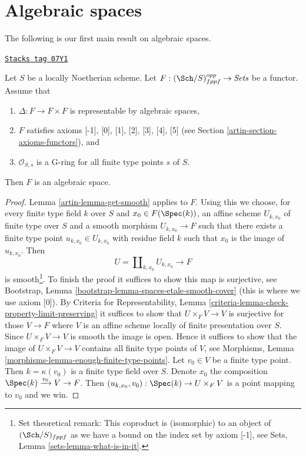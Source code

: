 \section{Algebraic spaces}
\label{artin-section-algebraic-spaces}
The following is our first main result on algebraic spaces.

\begin{proposition}
\label{artin-proposition-spaces-diagonal-representable}
\href{https://stacks.math.columbia.edu/tag/07Y1}{\texttt{Stacks tag 07Y1}}

Let $S$ be a locally Noetherian scheme. Let
$F : (\Sch/S)_{fppf}^{opp} \to \textit{Sets}$ be a functor. Assume that
\begin{enumerate}
\item $\Delta : F \to F \times F$ is representable by algebraic spaces,
\item $F$ satisfies axioms [-1], [0], [1], [2], [3], [4], [5]
(see Section \ref{artin-section-axioms-functors}), and
\item $\mathcal{O}_{S, s}$ is a G-ring for all finite type points $s$ of $S$.
\end{enumerate}
Then $F$ is an algebraic space.
\end{proposition}

\begin{proof}

Lemma \ref{artin-lemma-get-smooth} applies to $F$. Using this we
choose, for every finite type field $k$ over $S$ and $x_0 \in F(\Spec(k))$,
an affine scheme $U_{k, x_0}$ of finite type over $S$ and a smooth morphism
$U_{k, x_0} \to F$ such that there exists a finite type point
$u_{k, x_0} \in U_{k, x_0}$ with residue field $k$ such that $x_0$
is the image of $u_{k, x_0}$. Then
$$
U = \coprod\nolimits_{k, x_0} U_{k, x_0} \longrightarrow F
$$
is smooth\footnote{Set theoretical remark: This coproduct is (isomorphic)
to an object of $(\Sch/S)_{fppf}$ as we have a bound on the index set
by axiom [-1], see Sets, Lemma \ref{sets-lemma-what-is-in-it}.}.
To finish the proof it suffices to show this map is surjective,
see Bootstrap, Lemma \ref{bootstrap-lemma-spaces-etale-smooth-cover}
(this is where we use axiom [0]). By Criteria for Representability, Lemma
\ref{criteria-lemma-check-property-limit-preserving}
it suffices to show that $U \times_F V \to V$ is surjective for those
$V \to F$ where $V$ is an affine scheme locally of finite presentation
over $S$. Since $U \times_F V \to V$ is smooth the image is open. Hence
it suffices to show that the image of $U \times_F V \to V$ contains all
finite type points of $V$, see
Morphisms, Lemma \ref{morphisms-lemma-enough-finite-type-points}.
Let $v_0 \in V$ be a finite type point. Then $k = \kappa(v_0)$ is
a finite type field over $S$. Denote $x_0$ the composition
$\Spec(k) \xrightarrow{v_0} V \to F$. Then
$(u_{k, x_0}, v_0) : \Spec(k) \to U \times_F V$ is a point mapping to
$v_0$ and we win.
\end{proof}

